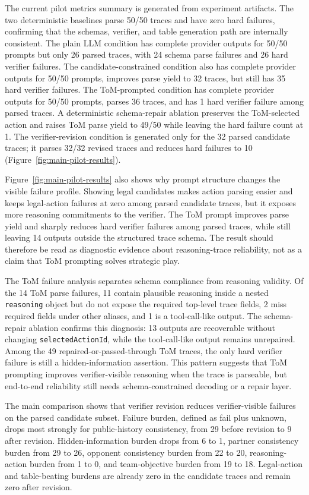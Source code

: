 \documentclass[sigconf,anonymous,review]{acmart}
\begin{document}
The current pilot metrics summary is generated from experiment artifacts. The two deterministic baselines parse 50/50 traces and have zero hard failures, confirming that the schemas, verifier, and table generation path are internally consistent. The plain LLM condition has complete provider outputs for 50/50 prompts but only 26 parsed traces, with 24 schema parse failures and 26 hard verifier failures. The candidate-constrained condition also has complete provider outputs for 50/50 prompts, improves parse yield to 32 traces, but still has 35 hard verifier failures. The ToM-prompted condition has complete provider outputs for 50/50 prompts, parses 36 traces, and has 1 hard verifier failure among parsed traces. A deterministic schema-repair ablation preserves the ToM-selected action and raises ToM parse yield to 49/50 while leaving the hard failure count at 1. The verifier-revision condition is generated only for the 32 parsed candidate traces; it parses 32/32 revised traces and reduces hard failures to 10 (Figure~\ref{fig:main-pilot-results}).

Figure~\ref{fig:main-pilot-results} also shows why prompt structure changes the visible failure profile. Showing legal candidates makes action parsing easier and keeps legal-action failures at zero among parsed candidate traces, but it exposes more reasoning commitments to the verifier. The ToM prompt improves parse yield and sharply reduces hard verifier failures among parsed traces, while still leaving 14 outputs outside the structured trace schema. The result should therefore be read as diagnostic evidence about reasoning-trace reliability, not as a claim that ToM prompting solves strategic play.

The ToM failure analysis separates schema compliance from reasoning validity. Of the 14 ToM parse failures, 11 contain plausible reasoning inside a nested \texttt{reasoning} object but do not expose the required top-level trace fields, 2 miss required fields under other aliases, and 1 is a tool-call-like output. The schema-repair ablation confirms this diagnosis: 13 outputs are recoverable without changing \texttt{selectedActionId}, while the tool-call-like output remains unrepaired. Among the 49 repaired-or-passed-through ToM traces, the only hard verifier failure is still a hidden-information assertion. This pattern suggests that ToM prompting improves verifier-visible reasoning when the trace is parseable, but end-to-end reliability still needs schema-constrained decoding or a repair layer.

The main comparison shows that verifier revision reduces verifier-visible failures on the parsed candidate subset. Failure burden, defined as fail plus unknown, drops most strongly for public-history consistency, from 29 before revision to 9 after revision. Hidden-information burden drops from 6 to 1, partner consistency burden from 29 to 26, opponent consistency burden from 22 to 20, reasoning-action burden from 1 to 0, and team-objective burden from 19 to 18. Legal-action and table-beating burdens are already zero in the candidate traces and remain zero after revision.
\end{document}
